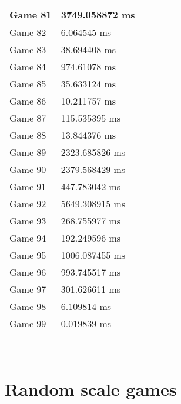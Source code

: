 \begin{multicols}{2}
\begin{tabular}{|l|l|}
	Game 81 & 3749.058872 ms \\ \hline
	Game 82 & 6.064545 ms \\ \hline
	Game 83 & 38.694408 ms \\ \hline
	Game 84 & 974.61078 ms \\ \hline
	Game 85 & 35.633124 ms \\ \hline
	Game 86 & 10.211757 ms \\ \hline
	Game 87 & 115.535395 ms \\ \hline
	Game 88 & 13.844376 ms \\ \hline
	Game 89 & 2323.685826 ms \\ \hline
	Game 90 & 2379.568429 ms \\ \hline
	Game 91 & 447.783042 ms \\ \hline
	Game 92 & 5649.308915 ms \\ \hline
	Game 93 & 268.755977 ms \\ \hline
	Game 94 & 192.249596 ms \\ \hline
	Game 95 & 1006.087455 ms \\ \hline
	Game 96 & 993.745517 ms \\ \hline
	Game 97 & 301.626611 ms \\ \hline
	Game 98 & 6.109814 ms \\ \hline
	Game 99 & 0.019839 ms \\ \hline
\end{tabular}\\
\end{multicols}\pagebreak\section{Random scale games}
